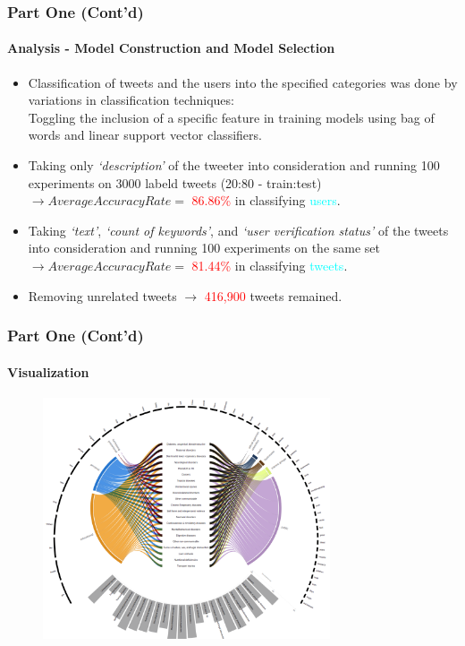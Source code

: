 \documentclass[11pt]{beamer}
\begin{document}
\begin{frame}
\frametitle{Part One (Cont'd)}
\framesubtitle{Analysis - Model Construction and Model Selection}
\begin{itemize}
	\item<1-> Classification of tweets and the users into the specified categories was done by variations in classification techniques:\\
	Toggling the inclusion of a specific feature in training models using bag of words and linear support vector classifiers.
	\item<2-> Taking only \textit{`description'} of the tweeter into consideration and running 100 experiments on 3000 labeld tweets (20:80 - train:test)\\
	$\rightarrow Average Accuracy Rate =$ \textcolor{red}{86.86\%} in classifying \textcolor{cyan}{users}.
	\item<3-> Taking \textit{`text'}, \textit{`count of keywords'}, and \textit{`user verification status'} of the tweets into consideration and running 100 experiments on the same set\\
	$\rightarrow Average Accuracy Rate =$ \textcolor{red}{81.44\%} in classifying \textcolor{cyan}{tweets}.
	\item<4-> Removing unrelated tweets $\rightarrow$ \textcolor{red}{416,900} tweets remained.
\end{itemize}
\end{frame}

\begin{frame}
\frametitle{Part One (Cont'd)}
\framesubtitle{Visualization}
	\begin{figure}
		\centering\includegraphics[width=8.5cm]{resources/config.png}
	\end{figure}
\end{frame}
\end{document}
